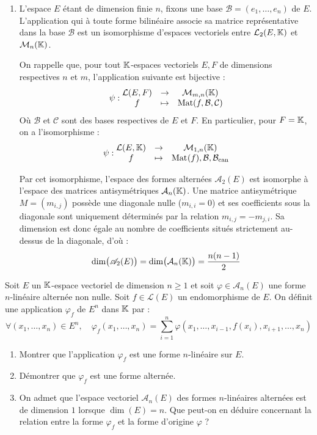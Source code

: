 \documentclass[12pt, a4paper]{report}
\begin{document}
\begin{enumerate}
    \item L'espace $E$ étant de dimension finie $n$, fixons une base $\mathcal{B} = (e_1, \dots, e_n)$ de $E$. L'application qui à toute forme bilinéaire associe sa matrice représentative dans la base $\mathcal{B}$ est un isomorphisme d'espaces vectoriels entre $\mathcal{L}_2(E, \mathbb{K})$ et $\mathcal{M}_n(\mathbb{K})$.
    
    On rappelle que, pour tout $\mathbb{K}$-espaces vectoriels $E,F$ de dimensions respectives $n$ et $m$, l'application suivante est bijective :
    $$\psi : \begin{matrix} \mathcal L(E,F) & \to & \mathcal M_{m,n}(\mathbb{K}) \\ f & \mapsto & \mathrm{Mat}(f,\mathcal{B},\mathcal{C}) \end{matrix}$$
    Où $\mathcal{B}$ et $\mathcal{C}$ sont des bases respectives de $E$ et $F$. En particulier, pour $F = \mathbb{K}$, on a l'isomorphisme :
    $$\psi : \begin{matrix} \mathcal L(E,\mathbb{K}) & \to & \mathcal M_{1,n}(\mathbb{K}) \\ f & \mapsto & \mathrm{Mat}_{}(f),\mathcal{B},\mathcal{B}_{\mathrm{can}} \end{matrix}$$


    Par cet isomorphisme, l'espace des formes alternées $\mathscr{A}_2(E)$ est isomorphe à l'espace des matrices antisymétriques $\mathcal{A}_n(\mathbb{K})$. Une matrice antisymétrique $M = (m_{i,j})$ possède une diagonale nulle ($m_{i,i} = 0$) et ses coefficients sous la diagonale sont uniquement déterminés par la relation $m_{i,j} = -m_{j,i}$. Sa dimension est donc égale au nombre de coefficients situés strictement au-dessus de la diagonale, d'où :
    $$\dim\bigl(\mathscr{A}_2(E)\bigr) = \dim\bigl(\mathcal{A}_n(\mathbb{K})\bigr) = \frac{n(n-1)}{2}$$
\end{enumerate}

\begin{exercise}
    Soit $E$ un $\mathbb{K}$-espace vectoriel de dimension $n \ge 1$ et soit $\varphi \in \mathscr{A}_n(E)$ une forme $n$-linéaire alternée non nulle. 
    Soit $f \in \mathcal{L}(E)$ un endomorphisme de $E$. On définit une application $\varphi_f$ de $E^n$ dans $\mathbb{K}$ par :
    $$\forall (x_1, \dots, x_n) \in E^n, \quad \varphi_f(x_1, \dots, x_n) = \sum_{i=1}^n \varphi(x_1, \dots, x_{i-1}, f(x_i), x_{i+1}, \dots, x_n)$$
    
    \begin{enumerate}
        \item Montrer que l'application $\varphi_f$ est une forme $n$-linéaire sur $E$.
        \item Démontrer que $\varphi_f$ est une forme alternée.
        \item On admet que l'espace vectoriel $\mathscr{A}_n(E)$ des formes $n$-linéaires alternées est de dimension $1$ lorsque $\dim(E) = n$. Que peut-on en déduire concernant la relation entre la forme $\varphi_f$ et la forme d'origine $\varphi$ ?
    \end{enumerate}
\end{exercise}
\end{document}
